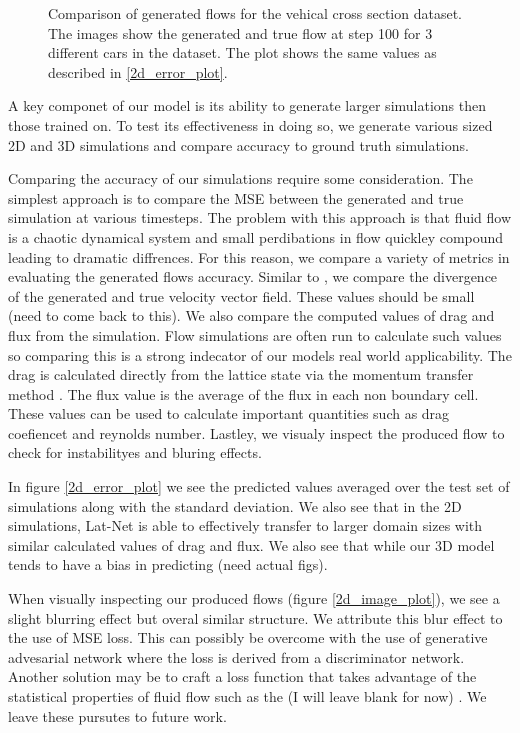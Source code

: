\documentclass{article}
\begin{document}
\begin{figure}[!t]
\caption{Comparison of generated flows for the vehical cross section dataset. The images show the generated and true flow at step 100 for 3 different cars in the dataset. The plot shows the same values as described in \ref{2d_error_plot}.}
\label{car_dataset}
\end{figure}


A key componet of our model is its ability to generate larger simulations then those trained on. To test its effectiveness in doing so, we generate various sized 2D and 3D simulations and compare accuracy to ground truth simulations.

Comparing the accuracy of our simulations require some consideration. The simplest approach is to compare the MSE between the generated and true simulation at various timesteps. The problem with this approach is that fluid flow is a chaotic dynamical system and small perdibations in flow quickley compound leading to dramatic diffrences. For this reason, we compare a variety of metrics in evaluating the generated flows accuracy. Similar to \cite{tompson2016accelerating}, we compare the divergence of the generated and true velocity vector field. These values should be small (need to come back to this). We also compare the computed values of drag and flux from the simulation. Flow simulations are often run to calculate such values so comparing this is a strong indecator of our models real world applicability. The drag is calculated directly from the lattice state via the momentum transfer method \cite{guo2013lattice}. The flux value is the average of the flux in each non boundary cell. These values can be used to calculate important quantities such as drag coefiencet and reynolds number. Lastley, we visualy inspect the produced flow to check for instabilityes and bluring effects.

In figure \ref{2d_error_plot} we see the predicted values averaged over the test set of simulations along with the standard deviation. We also see that in the 2D simulations, Lat-Net is able to effectively transfer to larger domain sizes with similar calculated values of drag and flux. We also see that while our 3D model tends to have a bias in predicting (need actual figs).

When visually inspecting our produced flows (figure \ref{2d_image_plot}), we see a slight blurring effect but overal similar structure. We attribute this blur effect to the use of MSE loss. This can possibly be overcome with the use of generative advesarial network \cite{goodfellow2014generative} where the loss is derived from a discriminator network. Another solution may be to craft a loss function that takes advantage of the statistical properties of fluid flow such as the (I will leave blank for now) \cite{kim2008wavelet}. We leave these pursutes to future work.
\end{document}
